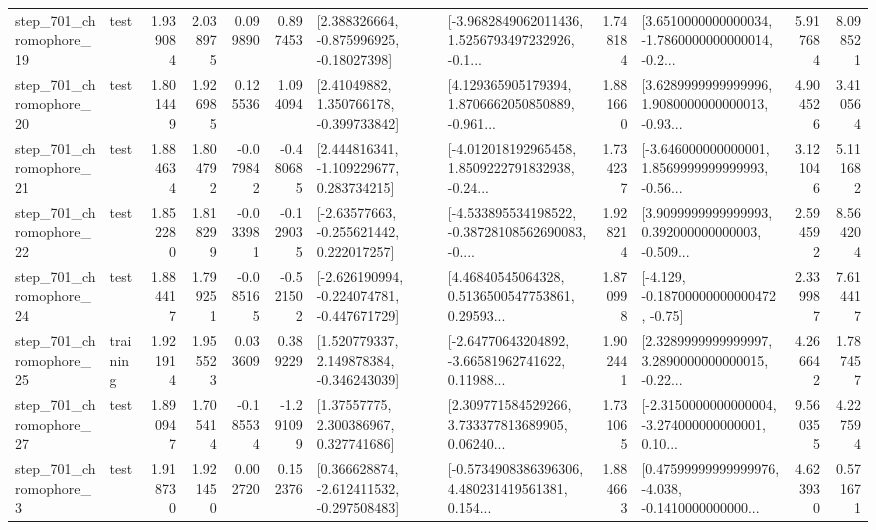 \begin{tabular}{llrrrrllrlrr}
  step\_701\_chromophore\_19 &      test &      1.939084 &    2.038975 &      0.099890 &  0.897453 &    [2.388326664, -0.875996925, -0.18027398] &  [-3.9682849062011436, 1.5256793497232926, -0.1... &       1.748184 &  [3.6510000000000034, -1.7860000000000014, -0.2... &            5.917684 &          8.098521 \\
  step\_701\_chromophore\_20 &      test &      1.801449 &    1.926985 &      0.125536 &  1.094094 &     [2.41049882, 1.350766178, -0.399733842] &  [4.129365905179394, 1.8706662050850889, -0.961... &       1.881660 &  [3.6289999999999996, 1.9080000000000013, -0.93... &            4.904526 &          3.410564 \\
  step\_701\_chromophore\_21 &      test &      1.884634 &    1.804792 &     -0.079842 & -0.480685 &    [2.444816341, -1.109229677, 0.283734215] &  [-4.012018192965458, 1.8509222791832938, -0.24... &       1.734237 &  [-3.646000000000001, 1.8569999999999993, -0.56... &            3.121046 &          5.111682 \\
  step\_701\_chromophore\_22 &      test &      1.852280 &    1.818299 &     -0.033981 & -0.129035 &    [-2.63577663, -0.255621442, 0.222017257] &  [-4.533895534198522, -0.38728108562690083, -0.... &       1.928214 &  [3.9099999999999993, 0.392000000000003, -0.509... &            2.594592 &          8.564204 \\
  step\_701\_chromophore\_24 &      test &      1.884417 &    1.799251 &     -0.085165 & -0.521502 &  [-2.626190994, -0.224074781, -0.447671729] &  [4.46840545064328, 0.5136500547753861, 0.29593... &       1.870998 &              [-4.129, -0.18700000000000472, -0.75] &            2.339987 &          7.614417 \\
  step\_701\_chromophore\_25 &  training &      1.921914 &    1.955523 &      0.033609 &  0.389229 &    [1.520779337, 2.149878384, -0.346243039] &  [-2.64770643204892, -3.66581962741622, 0.11988... &       1.902441 &  [2.3289999999999997, 3.2890000000000015, -0.22... &            4.266642 &          1.787457 \\
  step\_701\_chromophore\_27 &      test &      1.890947 &    1.705414 &     -0.185534 & -1.291099 &      [1.37557775, 2.300386967, 0.327741686] &  [2.309771584529266, 3.733377813689905, 0.06240... &       1.731065 &  [-2.3150000000000004, -3.274000000000001, 0.10... &            9.560355 &          4.227594 \\
   step\_701\_chromophore\_3 &      test &      1.918730 &    1.921450 &      0.002720 &  0.152376 &   [0.366628874, -2.612411532, -0.297508483] &  [-0.5734908386396306, 4.480231419561381, 0.154... &       1.884663 &  [0.47599999999999976, -4.038, -0.1410000000000... &            4.623930 &          0.571671 \\

\end{tabular}
